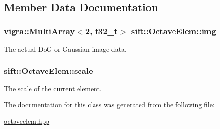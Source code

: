 \subsection{Member Data Documentation}
\hypertarget{classsift_1_1OctaveElem_adb650aac85f74b82a5d3ea1d5a8e66e2}{}
\subsubsection[{img}]{\setlength{\rightskip}{0pt plus 5cm}vigra\+::\+Multi\+Array$<$2, {\bf f32\+\_\+t}$>$ sift\+::\+Octave\+Elem\+::img}\label{classsift_1_1OctaveElem_adb650aac85f74b82a5d3ea1d5a8e66e2}
The actual Do\+G or Gaussian image data. \hypertarget{classsift_1_1OctaveElem_a20c52ec14f807ff469e3602dfb79cb88}{}
\subsubsection[{scale}]{ sift\+::\+Octave\+Elem\+::scale}\label{classsift_1_1OctaveElem_a20c52ec14f807ff469e3602dfb79cb88}
The scale of the current element. 

The documentation for this class was generated from the following file\+:\begin{DoxyCompactItemize}
\item 
\hyperlink{octaveelem_8hpp}{octaveelem.\+hpp}\end{DoxyCompactItemize}
